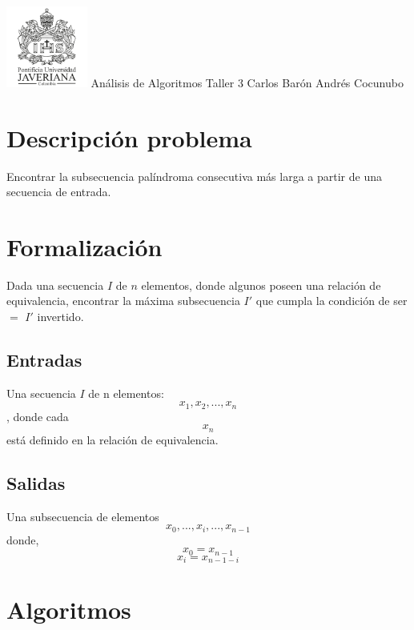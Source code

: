 \documentclass{article}
\begin{document}
\begin{center}
\includegraphics[width=0.2\textwidth]{logoPUJ.png}\newline
Análisis de Algoritmos\newline
Taller 3\newline
Carlos Barón\newline
Andrés Cocunubo\newline
\end{center}
\section{Descripción problema}
Encontrar la subsecuencia palíndroma consecutiva más larga a partir de una secuencia de entrada.
\section{Formalización}
Dada una secuencia \(I\) de \(n\) elementos, donde algunos poseen  una  relación de equivalencia, encontrar la máxima subsecuencia \(I'\) que cumpla la condición de ser  \(=\)  \(I'\) invertido.
\subsection{Entradas}
Una secuencia \(I\) de n elementos: \[x_{1},x_{2},...,x_{n}\] , donde cada \[x_{n}\] está definido en la relación de equivalencia.
\subsection{Salidas}
Una subsecuencia de elementos \[x_{0},...,x_{i},...,x_{n-1}\] donde, \[x_{0}=x_{n-1}\] \[x_{i}=x_{n-1-i}\] 
\section{Algoritmos}
\end{document}
